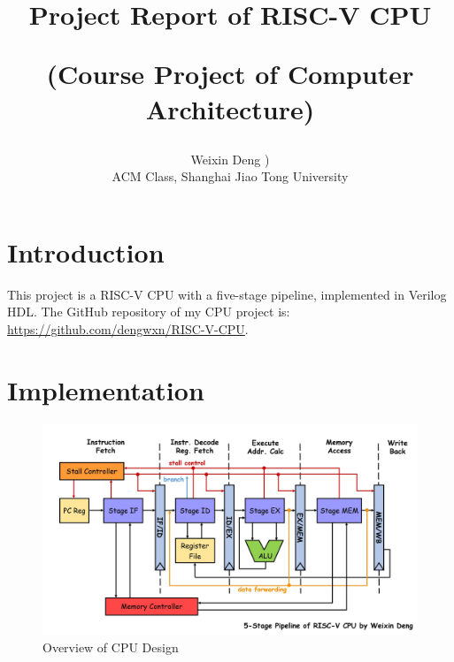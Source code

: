 \documentclass[12pt, a4paper]{article}
\newcounter{footnotesintable}
\begin{document}
\title{Project Report of RISC-V CPU\\\begin{large}(Course Project of Computer Architecture)\end{large}}
\author{Weixin Deng {)}\\ACM Class, Shanghai Jiao Tong University}
\date{}

\maketitle

\section{Introduction}

This project is a RISC-V CPU with a five-stage pipeline, implemented in Verilog HDL. The GitHub repository of my CPU project is: \url{https://github.com/dengwxn/RISC-V-CPU}.

\section{Implementation}

\begin{figure}[!ht]\centering
	\includegraphics[scale=0.23]{graph.jpg}
	\caption{Overview of CPU Design}
\end{figure}
\end{document}
